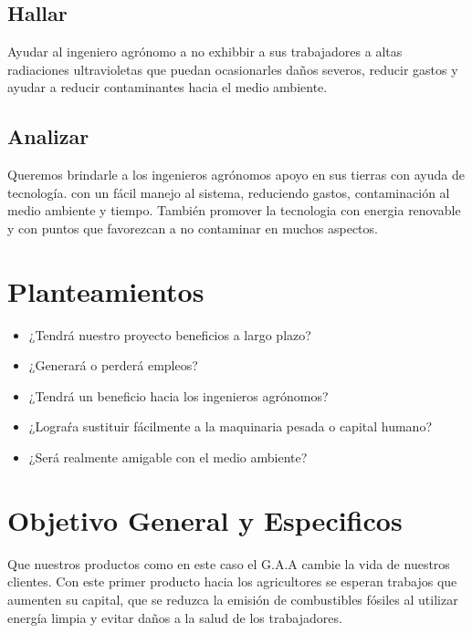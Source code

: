 \documentclass[11pt,a4paper]{article}
\begin{document}
\subsection{Hallar}
Ayudar al ingeniero agrónomo a no exhibbir a sus trabajadores a altas radiaciones ultravioletas que puedan ocasionarles daños severos, reducir gastos y ayudar a reducir contaminantes hacia el medio ambiente.
\subsection{Analizar}
Queremos brindarle a los ingenieros agrónomos apoyo en sus tierras con ayuda de tecnología. con un fácil manejo al sistema, reduciendo gastos, contaminación al medio ambiente y tiempo. También promover la tecnologia con energia renovable y con puntos que favorezcan a no contaminar en muchos aspectos.
\section{Planteamientos}

\begin{itemize}

\item ¿Tendrá nuestro proyecto beneficios a largo plazo?\\
\item ¿Generará o perderá empleos?\\
\item ¿Tendrá un beneficio hacia los ingenieros agrónomos?\\
\item ¿Lograŕa sustituir fácilmente a la maquinaria pesada o capital humano?\\
\item ¿Será realmente amigable con el medio ambiente?\\
\end{itemize} 

\section{Objetivo General y Especificos}

Que nuestros productos como en este caso el G.A.A cambie la vida de nuestros clientes. Con este primer producto hacia los agricultores se esperan trabajos que aumenten su capital, que se reduzca la emisión de combustibles fósiles al utilizar energía limpia y evitar daños a la salud de los trabajadores.\\
\end{document}
